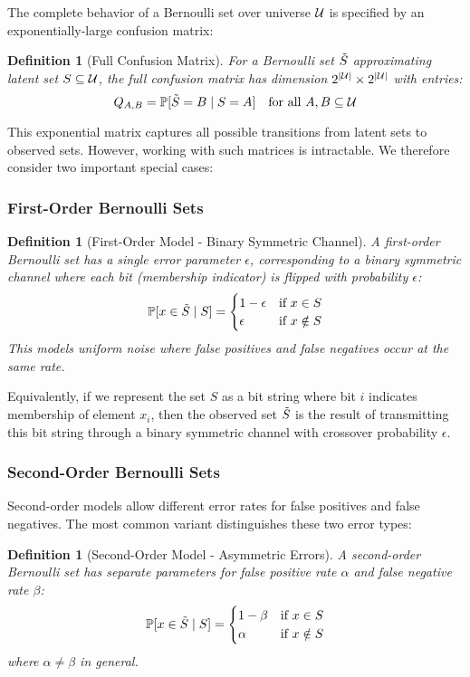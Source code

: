 \documentclass[11pt]{article}
\newtheorem{definition}[theorem]{Definition}
\begin{document}
The complete behavior of a Bernoulli set over universe $\mathcal{U}$ is specified by an exponentially-large confusion matrix:

\begin{definition}[Full Confusion Matrix]
For a Bernoulli set $\tilde{S}$ approximating latent set $S \subseteq \mathcal{U}$, the full confusion matrix has dimension $2^{|\mathcal{U}|} \times 2^{|\mathcal{U}|}$ with entries:
\[
Q_{A,B} = \mathbb{P}[\tilde{S} = B \mid S = A] \quad \text{for all } A, B \subseteq \mathcal{U}
\]
\end{definition}

This exponential matrix captures all possible transitions from latent sets to observed sets. However, working with such matrices is intractable. We therefore consider two important special cases:

\subsubsection{First-Order Bernoulli Sets}

\begin{definition}[First-Order Model - Binary Symmetric Channel]
A first-order Bernoulli set has a single error parameter $\epsilon$, corresponding to a binary symmetric channel where each bit (membership indicator) is flipped with probability $\epsilon$:
\[
\mathbb{P}[x \in \tilde{S} \mid S] = \begin{cases}
1 - \epsilon & \text{if } x \in S \\
\epsilon & \text{if } x \notin S
\end{cases}
\]
This models uniform noise where false positives and false negatives occur at the same rate.
\end{definition}

Equivalently, if we represent the set $S$ as a bit string where bit $i$ indicates membership of element $x_i$, then the observed set $\tilde{S}$ is the result of transmitting this bit string through a binary symmetric channel with crossover probability $\epsilon$.

\subsubsection{Second-Order Bernoulli Sets}

Second-order models allow different error rates for false positives and false negatives. The most common variant distinguishes these two error types:

\begin{definition}[Second-Order Model - Asymmetric Errors]
A second-order Bernoulli set has separate parameters for false positive rate $\alpha$ and false negative rate $\beta$:
\[
\mathbb{P}[x \in \tilde{S} \mid S] = \begin{cases}
1 - \beta & \text{if } x \in S \\
\alpha & \text{if } x \notin S
\end{cases}
\]
where $\alpha \neq \beta$ in general.
\end{definition}
\end{document}
